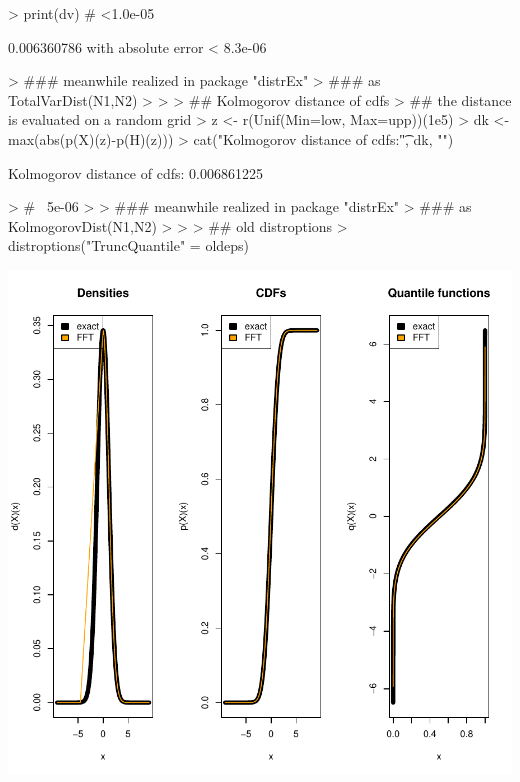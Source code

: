 \documentclass[11pt]{article}
\begin{document}
\begin{Schunk}
\begin{Soutput}
\end{Soutput}
\begin{Sinput}
> print(dv) # <1.0e-05
\end{Sinput}
\begin{Soutput}
0.006360786 with absolute error < 8.3e-06
\end{Soutput}
\begin{Sinput}
> ### meanwhile realized in package "distrEx" 
> ### as TotalVarDist(N1,N2)
> 
> 
> ## Kolmogorov distance of cdfs 
> ## the distance is evaluated on a random grid
> z <- r(Unif(Min=low, Max=upp))(1e5)
> dk <- max(abs(p(X)(z)-p(H)(z)))
> cat("Kolmogorov distance of cdfs:\t", dk, "\n") 
\end{Sinput}
\begin{Soutput}
Kolmogorov distance of cdfs:	 0.006861225 
\end{Soutput}
\begin{Sinput}
> # ~5e-06
> 
> ### meanwhile realized in package "distrEx" 
> ### as KolmogorovDist(N1,N2)
> 
> 
> ## old distroptions
> distroptions("TruncQuantile" = oldeps)
\end{Sinput}
\end{Schunk}
\includegraphics{distr-StationaryRegressorDistr}
\end{document}

